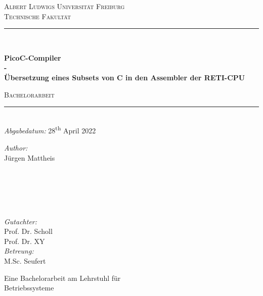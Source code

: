 \begin{titlepage}
  \vspace{1cm}
  \center
  \textsc{\LARGE Albert Ludwigs Universität Freiburg}\\[0.5cm]
  \textsc{\Large Technische Fakultät}\\[2.0cm]

  \rule{\linewidth}{0.5mm}\\[0.5cm]
    {\huge \bfseries PicoC-Compiler\\\LARGE - \\ Übersetzung eines Subsets von C in den Assembler der RETI-CPU\par}
    \vspace{0.5cm}
    \textsc{\large Bachelorarbeit}\\
    \rule{\linewidth}{0.5mm}\\[0.5cm]

  {\large \emph{Abgabedatum:} 28\textsuperscript{th} April 2022}\\[2.5cm]

  \begin{minipage}{0.45\textwidth}
    \begin{flushleft} \large
      \emph{Author:}\\
      Jürgen Mattheis\\
      \hspace{1cm}\\
      \hspace{1cm}\\
      \hspace{1cm}\\
      \hspace{1cm}
    \end{flushleft}
  \end{minipage}
  ~
  \begin{minipage}{0.45\textwidth}
    \begin{flushright} \large
      \emph{Gutachter:}\\
      Prof. Dr. Scholl\\
      Prof. Dr. XY\\[0.64cm]
      \emph{Betreung:}\\
      M.Sc. Seufert\\
    \end{flushright}
  \end{minipage}

  \vspace{9.5cm}
  \large{Eine Bachelorarbeit am Lehrstuhl für}\\
  \large{Betriebssysteme}
\end{titlepage}
